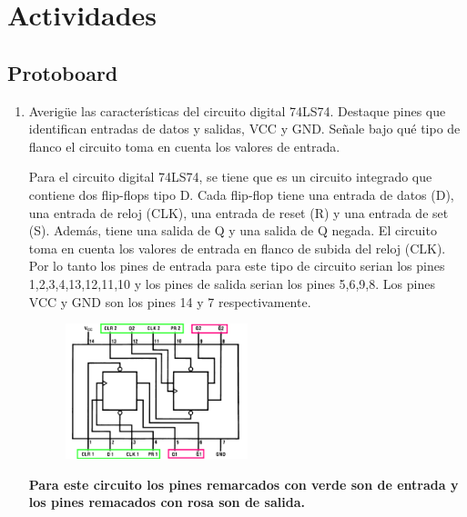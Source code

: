 \documentclass{templateNote}
\begin{document}

\portada
\margenes

\section{Actividades}
\subsection{Protoboard}
\begin{enumerate}
    \item Averigüe las características del circuito digital 74LS74. Destaque pines que identifican entradas de datos y salidas, VCC y GND. Señale bajo qué tipo de flanco el circuito toma en cuenta los valores de entrada.
    
    Para el circuito digital 74LS74, se tiene que es un circuito integrado que contiene dos flip-flops tipo D. Cada flip-flop tiene una entrada de datos (D), una entrada de reloj (CLK), una entrada de reset (R) y una entrada de set (S). Además, tiene una salida de Q y una salida de Q negada. El circuito toma en cuenta los valores de entrada en flanco de subida del reloj (CLK). Por lo tanto los pines de entrada para este tipo de circuito
        serian los pines 1,2,3,4,13,12,11,10 y los pines de salida serian los pines 5,6,9,8. Los pines VCC y GND son los pines 14 y 7 respectivamente.

        \begin{figure}[H]
            \centering
            \includegraphics[width=0.5\textwidth]{img/entr-salid.png}
        \end{figure}
    
    \textbf{Para este circuito los pines remarcados con verde son de entrada y los pines remacados con rosa son de salida.}


\end{enumerate}
\end{document}

